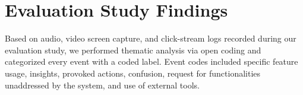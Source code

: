 \section{Evaluation Study Findings\label{sec:eval_findings}}
Based on audio, video screen capture,
and click-stream logs recorded
during our evaluation study,
we performed thematic analysis via open coding
and categorized every event with a coded label.
Event codes included specific feature usage,
insights,
provoked actions, confusion,
request for functionalities unaddressed
by the system, and use of external tools.
